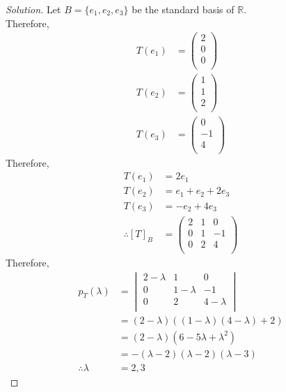 \documentclass[fleqn, a4paper, 12pt]{article}
\theoremstyle{definition}
\theoremstyle{theorem}
\theoremstyle{remark}
\newenvironment{solution} %
	{\begin{proof}[Solution]\let\qed\relax}
	{\end{proof}}
\numberwithin{corollary}{theorem}
\numberwithin{equation}{theorem}
\begin{document}
\begin{solution}
	Let $B = \{e_1, e_2, e_3\}$ be the standard basis of $\mathbb{R}$.\\
	Therefore,
	\begin{align*}
		T(e_1) &=
			\begin{pmatrix}
				2\\
				0\\
				0\\
			\end{pmatrix}\\
		T(e_2) &= 
			\begin{pmatrix}
				1\\
				1\\
				2\\
			\end{pmatrix}\\
		T(e_3) &=
			\begin{pmatrix}
				0\\
				-1\\
				4\\
			\end{pmatrix}
	\end{align*}
	Therefore,
	\begin{align*}
		T(e_1) &= 2 e_1\\
		T(e_2) &= e_1 + e_2 + 2 e_3\\
		T(e_3) &= -e_2 + 4 e_3\\
		\therefore [T]_B &= 
			\begin{pmatrix}
				2 & 1 & 0\\
				0 & 1 & -1\\
				0 & 2 & 4\\
			\end{pmatrix}
	\end{align*}
	Therefore,
	\begin{align*}
		p_T(\lambda) &= 
			\begin{vmatrix}
				2 - \lambda & 1 & 0\\
				0 & 1 - \lambda & -1\\
				0 & 2 & 4 - \lambda\\
			\end{vmatrix}\\
		&= (2 - \lambda) \left( (1 - \lambda) (4 - \lambda) + 2 \right)\\
		&= (2 - \lambda) (6 - 5 \lambda + \lambda^2 )\\
		&= - (\lambda - 2) (\lambda - 2) (\lambda - 3)\\
		\therefore \lambda &= 2, 3
	\end{align*}

\end{solution}
\end{document}
